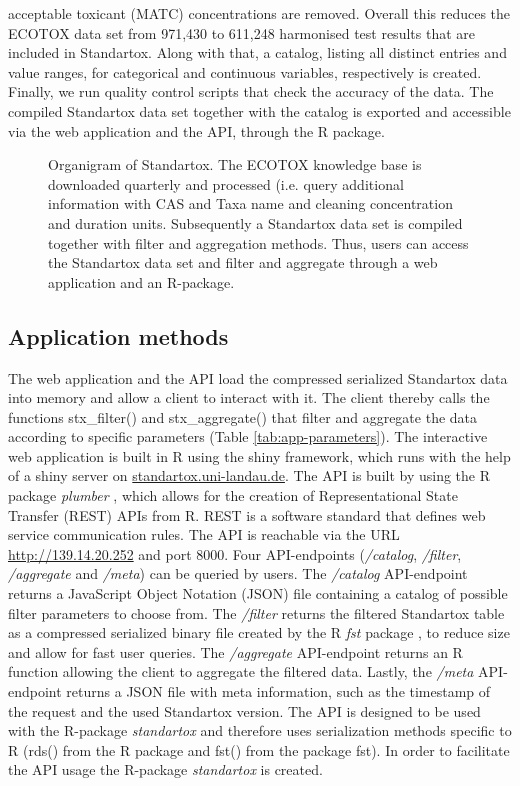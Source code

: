 \documentclass[journal,datadescriptor,accept,moreauthors,pdftex]{Definitions/mdpi}
\begin{document}
acceptable toxicant (MATC) concentrations are removed. Overall this reduces the ECOTOX data set from 971,430 to 611,248 harmonised test results that are included in Standartox. Along with that, a catalog, listing all distinct entries and value ranges, for categorical and continuous variables, respectively is created. Finally, we run quality control scripts that check the accuracy of the data. The compiled Standartox data set together with the catalog is exported and accessible via the web application and the API, through the R package.

\begin{figure}
    \centering
    
    \caption{Organigram of Standartox. The ECOTOX knowledge base is downloaded quarterly and processed (i.e. query additional information with CAS and Taxa name and cleaning concentration and duration units. Subsequently a Standartox data set is compiled together with filter and aggregation methods. Thus, users can access the Standartox data set and filter and aggregate through a web application and an R-package.}
    \label{fig:stx-organigram}
\end{figure}

\subsection{Application methods}
The web application and the API load the compressed serialized Standartox data into memory and allow a client to interact with it. The client thereby calls the functions stx\_filter() and stx\_aggregate() that filter and aggregate the data according to specific parameters (Table \ref{tab:app-parameters}). The interactive web application is built in R using the shiny framework, which runs with the help of a shiny server \citep{chang_shiny_2018} on \url{standartox.uni-landau.de}. The API is built by using the R package \textit{plumber} \citep{trestletechnologyllc_plumber_2018}, which allows for the creation of Representational State Transfer (REST) APIs from R. REST is a software standard that defines web service communication rules. The API is reachable via the URL \url{http://139.14.20.252} and port 8000. Four API-endpoints (\textit{/catalog}, \textit{/filter}, \textit{/aggregate} and \textit{/meta}) can be queried by users. The \textit{/catalog} API-endpoint returns a JavaScript Object Notation (JSON) file containing a catalog of possible filter parameters to choose from. The \textit{/filter} returns the filtered Standartox table as a compressed serialized binary file created by the R \textit{fst} package \citep{klik_fst_2019}, to reduce size and allow for fast user queries. The \textit{/aggregate} API-endpoint returns an R function allowing the client to aggregate the filtered data. Lastly, the \textit{/meta} API-endpoint returns a JSON file with meta information, such as the timestamp of the request and the used Standartox version. The API is designed to be used with the R-package \textit{standartox} and therefore uses serialization methods specific to R (rds() from the R package  and fst() from the package fst). In order to facilitate the API usage the R-package \textit{standartox} is created.
\end{document}
